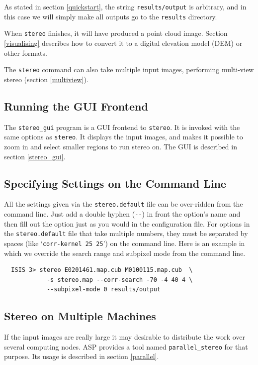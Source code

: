 As stated in section \ref{quickstart}, the string
\texttt{results/output} is arbitrary, and in this case we will
simply make all outputs go to the \texttt{results} directory.

When \texttt{stereo} finishes, it will have produced a point cloud
image. Section \ref{visualising} describes how to convert it to a
digital elevation model (DEM) or other formats.

The \texttt{stereo} command can also take multiple input images, performing
multi-view stereo (section \ref{multiview}).

\subsection{Running the GUI Frontend}
The \texttt{stereo\_gui} program is a GUI frontend to \texttt{stereo}.
It is invoked with the same options as \texttt{stereo}. It displays
the input images, and makes it possible to zoom in and select smaller
regions to run stereo on. The GUI is described in section \ref{stereo_gui}.

\subsection{Specifying Settings on the Command Line}
\label{cmdline}

All the settings given via the \texttt{stereo.default} file can be
over-ridden from the command line. Just add a double hyphen
(\texttt{-\/-}) in front the option's name and then fill out the option
just as you would in the configuration file. For options in the
\texttt{stereo.default} file that take multiple numbers, they must be
separated by spaces (like `\texttt{corr-kernel~25~25}') on the command
line. Here is an example in which we override the search range and
subpixel mode from the command line.

\begin{verbatim}
  ISIS 3> stereo E0201461.map.cub M0100115.map.cub  \
            -s stereo.map --corr-search -70 -4 40 4 \
            --subpixel-mode 0 results/output
\end{verbatim}

\subsection{Stereo on Multiple Machines}

If the input images are really large it may desirable to distribute the
work over several computing nodes. ASP provides a tool named
\texttt{parallel\_stereo} for that purpose. Its usage is described in section
\ref{parallel}.

